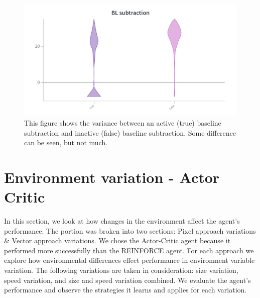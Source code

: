 \documentclass{article}
\begin{document}
\begin{figure}[htbp]
    \centering
    \includegraphics[width=\linewidth]{figs/baseline.png}
    \caption{This figure shows the variance between an active (true) baseline subtraction and inactive (false) baseline subtraction. Some difference can be seen, but not much.}
    \label{fig:baseline}
\end{figure}

\section{Environment variation - Actor Critic}
\label{Environment}
In this section, we look at how changes in the environment affect the agent's performance. 
The portion was broken into two sections: Pixel approach variations \& Vector approach variations.
We chose the Actor-Critic agent because it performed more successfully than the REINFORCE agent.
For each approach we explore how environmental differences effect performance in environment variable variation. 
The following variations are taken in consideration: size variation, speed variation, and size and speed variation combined.
We evaluate the agent's performance and observe the strategies it learns and applies for each variation.
\end{document}
